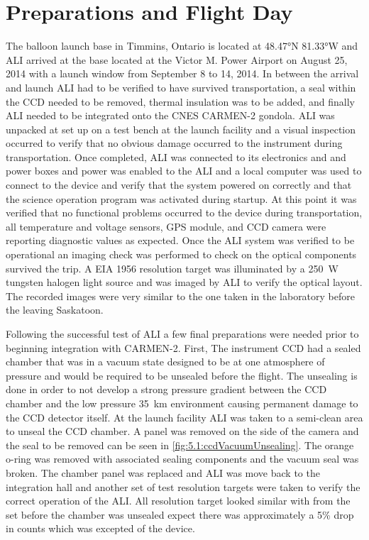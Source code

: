 \section{Preparations and Flight Day}

The balloon launch base in Timmins, Ontario is located at 48.47\si{\degree}N 81.33\si{\degree}W and ALI arrived at the base located at the Victor M. Power Airport on August 25, 2014 with a launch window from September 8 to 14, 2014. In between the arrival and launch ALI had to be verified to have survived transportation, a seal within the CCD needed to be removed, thermal insulation was to be added, and finally ALI needed to be integrated onto the CNES CARMEN-2 gondola. ALI was unpacked at set up on a test bench at the launch facility and a visual inspection occurred to verify that no obvious damage occurred to the instrument during transportation. Once completed, ALI was connected to its electronics and and power boxes and power was enabled to the ALI and a local computer was used to connect to the device and verify that the system powered on correctly and that the science operation program was activated during startup. At this point it was verified that no functional problems occurred to the device during transportation, all temperature and voltage sensors, GPS module, and CCD camera were reporting diagnostic values as expected. Once the ALI system was verified to be operational an imaging check was performed to check on the optical components survived the trip. A EIA 1956 resolution target was illuminated by a 250~W tungsten halogen light source and was imaged by ALI to verify the optical layout. The recorded images were very similar to the one taken in the laboratory before the leaving Saskatoon.

Following the successful test of ALI a few final preparations were needed prior to beginning integration with CARMEN-2. First, The instrument CCD had a sealed chamber that was in a vacuum state designed to be at one atmosphere of pressure and would be required to be unsealed before the flight. The unsealing is done in order to not develop a strong pressure gradient between the CCD chamber and the low pressure 35~km environment causing permanent damage to the CCD detector itself. At the launch facility ALI was taken to a semi-clean area to unseal the CCD chamber. A panel was removed on the side of the camera and the seal to be removed can be seen in \autoref{fig:5.1:ccdVacuumUnsealing}. The orange o-ring was removed with associated sealing components and the vacuum seal was broken. The chamber panel was replaced and ALI was move back to the integration hall and another set of test resolution targets were taken to verify the correct operation of the ALI. All resolution target looked similar with from the set before the chamber was unsealed expect there was approximately a 5\% drop in counts which was excepted of the device.


